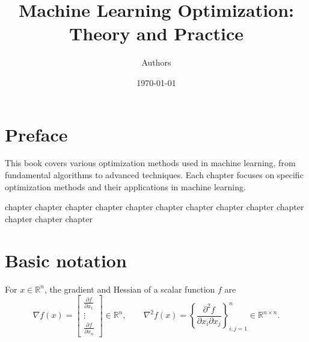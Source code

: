 \documentclass[11pt,a4paper]{book}
\title{Machine Learning Optimization: Theory and Practice}
\author{Authors}
\date{\today}
\numberwithin{equation}{chapter}
\numberwithin{algorithm}{chapter}
\numberwithin{theorem}{chapter}
\numberwithin{lemma}{chapter}
\numberwithin{claim}{chapter}
\numberwithin{definition}{chapter}
\numberwithin{example}{chapter}
\numberwithin{corollary}{chapter}
\begin{document}
\frontmatter
\maketitle

\tableofcontents

\chapter*{Preface}
This book covers various optimization methods used in machine learning, from fundamental algorithms to advanced techniques. Each chapter focuses on specific optimization methods and their applications in machine learning.

\mainmatter

{chapter}
{chapter}
{chapter}
{chapter}
{chapter}
{chapter}
{chapter}
{chapter}
{chapter}
{chapter}
{chapter}
{chapter}
{chapter}

\backmatter
\chapter{Basic notation}
For $x \in \mathbb{R}^{n}$, the gradient and Hessian of a scalar function $f$ are
\[
\nabla f(x)=\left[\begin{array}{c}
\frac{\partial f}{\partial x_{1}} \\
\vdots \\
\frac{\partial f}{\partial x_{n}}
\end{array}\right] \in \mathbb{R}^{n}, \qquad
\nabla^{2} f(x)=\left\{\frac{\partial^{2} f}{\partial x_{i} \partial x_{j}}\right\}_{i, j=1}^{n} \in \mathbb{R}^{n \times n} .
\]

\nocite{*}


\end{document}
